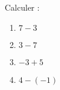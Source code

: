 
\begin{exercice}\label{exo2smath-0293}

    Calculer :
    \begin{multicols}{2}
        \begin{enumerate}
            \item
                \( 7-3\)
            \item
                \( 3-7\)
            \item
                \( -3+5\)
            \item
                \( 4-(-1)\)
        \end{enumerate}
    \end{multicols}

\end{exercice}

